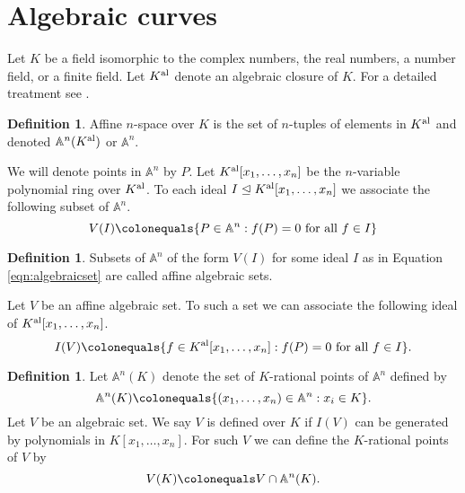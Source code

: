 \documentclass{dcthesis}
\renewcommand{\AA}{\mathbb A}
\newcommand{\defi}[1]{\textsf{#1}}
\newcommand{\Kal}{{{K}^{\textup{al}}}}
\theoremstyle{definition}
\newtheorem{definition}[prop]{Definition}
\theoremstyle{remark}
\numberwithin{equation}{section}
\numberwithin{figure}{section}
\begin{document}
{  \section{Algebraic curves}{\label{sec:algebraiccurves}
    Let $K$ be a field isomorphic to the complex numbers,
    the real numbers, a number field, or a finite field.
    Let $\Kal$ denote an algebraic closure of $K$.
    For a detailed treatment see
    \cite[Chapters 1-2]{silverman}.
    \begin{definition}
      \label{def:affinespace}
      \defi{Affine $n$-space} over $K$ is the
      set of $n$-tuples of elements in $\Kal$
      and denoted $\AA^n(\Kal)$ or $\AA^n$.
    \end{definition}
    We will denote \defi{points} in $\AA^n$ by $P$.
    Let $\Kal[x_1,\dots,x_n]$ be the $n$-variable
    polynomial ring over $\Kal$.
    To each ideal $I\trianglelefteq\Kal[x_1,\dots,x_n]$
    we associate the following subset of $\AA^n$.
    \begin{equation}
      \label{eqn:algebraicset}
      V(I)\colonequals
      \{P\in\AA^n : f(P) = 0 \text{ for all } f\in I\}
    \end{equation}
    \begin{definition}
      \label{def:algebraicset}
      Subsets of $\AA^n$
      of the form $V(I)$ for some ideal $I$
      as in Equation \ref{eqn:algebraicset}
      are called
      \defi{affine algebraic sets}.
    \end{definition}
    Let $V$ be an affine algebraic set.
    To such a set we can associate
    the following ideal of $\Kal[x_1,\dots,x_n]$.
    \begin{equation}
      \label{eqn:idealofalgebraicset}
      I(V)\colonequals
      \{f\in\Kal[x_1,\dots,x_n]: f(P)=0 \text{ for all }f\in I\}.
    \end{equation}
    \begin{definition}
      \label{def:definedoverK}
      Let $\AA^n(K)$ denote the set of
      \defi{$K$-rational points} of $\AA^n$ defined by
      \[
        \AA^n(K)\colonequals
        \{(x_1,\dots,x_n)\in\AA^n : x_i\in K\}.
      \]
      Let $V$ be an algebraic set.
      We say $V$ is
      \defi{defined over $K$}
      if $I(V)$ can be generated by
      polynomials in $K[x_1,\dots,x_n]$.
      For such $V$ we can define the
      \defi{$K$-rational points of $V$} by
      \[
        V(K)\colonequals
        V\cap\AA^n(K).
      \]
    \end{definition}
}}
\end{document}
